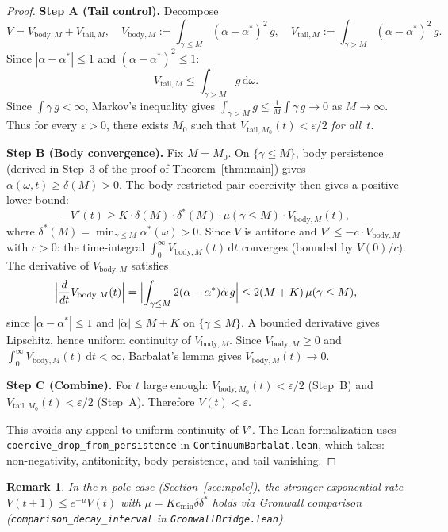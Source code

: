 \documentclass[11pt,a4paper]{article}
\newtheorem{remark}[theorem]{Remark}
\theoremstyle{definition}
\begin{document}
\begin{proof}
\textbf{Step A (Tail control).} Decompose
\[
V = V_{\mathrm{body},M} + V_{\mathrm{tail},M}, \quad
V_{\mathrm{body},M} := \int_{\gamma \leq M} (\alpha - \alpha^*)^2\,g, \quad
V_{\mathrm{tail},M} := \int_{\gamma > M} (\alpha - \alpha^*)^2\,g.
\]
Since $|\alpha - \alpha^*| \leq 1$ and $(\alpha - \alpha^*)^2 \leq 1$:
\[
V_{\mathrm{tail},M} \leq \int_{\gamma > M} g\,\mathrm{d}\omega.
\]
Since $\int \gamma\,g < \infty$, Markov's inequality gives $\int_{\gamma > M} g \leq \frac{1}{M}\int \gamma\,g \to 0$ as $M \to \infty$. Thus for every $\varepsilon > 0$, there exists $M_0$ such that $V_{\mathrm{tail},M_0}(t) < \varepsilon/2$ \emph{for all~$t$}.

\textbf{Step B (Body convergence).} Fix $M = M_0$. On $\{\gamma \leq M\}$, body persistence (derived in Step~3 of the proof of Theorem~\ref{thm:main}) gives $\alpha(\omega,t) \geq \delta(M) > 0$. The body-restricted pair coercivity then gives a positive lower bound:
\[
-V'(t) \geq K \cdot \delta(M) \cdot \delta^*(M) \cdot \mu(\gamma \leq M) \cdot V_{\mathrm{body},M}(t),
\]
where $\delta^*(M) = \min_{\gamma \leq M} \alpha^*(\omega) > 0$. Since $V$ is antitone and $V' \leq -c \cdot V_{\mathrm{body},M}$ with $c > 0$: the time-integral $\int_0^\infty V_{\mathrm{body},M}(t)\,\mathrm{d}t$ converges (bounded by $V(0)/c$). The derivative of $V_{\mathrm{body},M}$ satisfies
\[
\Bigl|\frac{d}{dt}V_{\mathrm{body},M}(t)\Bigr| = \Bigl|\int_{\gamma \leq M} 2(\alpha - \alpha^*)\dot\alpha\,g\Bigr| \leq 2(M+K)\,\mu(\gamma \leq M),
\]
since $|\alpha - \alpha^*| \leq 1$ and $|\dot\alpha| \leq M + K$ on $\{\gamma \leq M\}$. A bounded derivative gives Lipschitz, hence uniform continuity of $V_{\mathrm{body},M}$. Since $V_{\mathrm{body},M} \geq 0$ and $\int_0^\infty V_{\mathrm{body},M}(t)\,\mathrm{d}t < \infty$, Barbalat's lemma gives $V_{\mathrm{body},M}(t) \to 0$.

\textbf{Step C (Combine).} For $t$ large enough: $V_{\mathrm{body},M_0}(t) < \varepsilon/2$ (Step~B) and $V_{\mathrm{tail},M_0}(t) < \varepsilon/2$ (Step~A). Therefore $V(t) < \varepsilon$.

This avoids any appeal to uniform continuity of $V'$. The Lean formalization uses \texttt{coercive\_drop\_from\_persistence} in \texttt{ContinuumBarbalat.lean}, which takes: non-negativity, antitonicity, body persistence, and tail vanishing.
\end{proof}

\begin{remark}
In the $n$-pole case (Section~\ref{sec:npole}), the stronger exponential rate $V(t+1) \leq e^{-\mu}V(t)$ with $\mu = K c_{\min}\delta\delta^*$ holds via Gronwall comparison (\texttt{comparison\_decay\_interval} in \texttt{GronwallBridge.lean}).
\end{remark}
\end{document}
